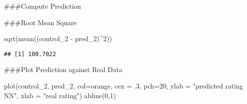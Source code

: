 \documentclass[
]{article}
\newenvironment{Shaded}{\begin{snugshade}}{\end{snugshade}}
\newcommand{\AttributeTok}[1]{\textcolor[rgb]{0.77,0.63,0.00}{#1}}
\newcommand{\DecValTok}[1]{\textcolor[rgb]{0.00,0.00,0.81}{#1}}
\newcommand{\FunctionTok}[1]{\textcolor[rgb]{0.00,0.00,0.00}{#1}}
\newcommand{\NormalTok}[1]{#1}
\newcommand{\OtherTok}[1]{\textcolor[rgb]{0.56,0.35,0.01}{#1}}
\newcommand{\SpecialCharTok}[1]{\textcolor[rgb]{0.00,0.00,0.00}{#1}}
\newcommand{\StringTok}[1]{\textcolor[rgb]{0.31,0.60,0.02}{#1}}
\begin{document}
\#\#\#Compute Prediction

\begin{Shaded}
\end{Shaded}

\#\#\#Root Mean Square

\begin{Shaded}
\begin{Highlighting}[]
\FunctionTok{sqrt}\NormalTok{(}\FunctionTok{mean}\NormalTok{((control\_2 }\SpecialCharTok{{-}}\NormalTok{ pred\_2)}\SpecialCharTok{\^{}}\DecValTok{2}\NormalTok{))}
\end{Highlighting}
\end{Shaded}

\begin{verbatim}
## [1] 100.7022
\end{verbatim}

\#\#\#Plot Prediction against Real Data

\begin{Shaded}
\begin{Highlighting}[]
\FunctionTok{plot}\NormalTok{(control\_2, pred\_2, }\AttributeTok{col=}\StringTok{\textquotesingle{}orange\textquotesingle{}}\NormalTok{, }\AttributeTok{cex =}\NormalTok{ .}\DecValTok{3}\NormalTok{, }\AttributeTok{pch=}\DecValTok{20}\NormalTok{, }\AttributeTok{ylab =} \StringTok{"predicted rating NN"}\NormalTok{, }\AttributeTok{xlab =} \StringTok{"real rating"}\NormalTok{)}
\FunctionTok{abline}\NormalTok{(}\DecValTok{0}\NormalTok{,}\DecValTok{1}\NormalTok{)}
\end{Highlighting}
\end{Shaded}
\end{document}
